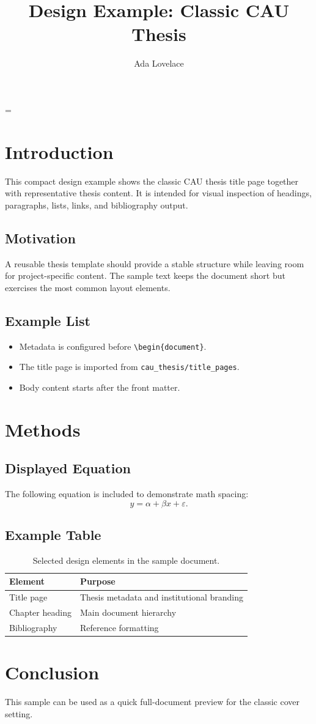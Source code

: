 \documentclass[12pt,a4paper]{../../../cau_thesis/cau_thesis}
\title{Design Example: Classic CAU Thesis}
\author{Ada Lovelace}
\institute{Institute of Computer Science}
\begin{document}
\sloppy
\hfuzz=\maxdimen
{}

\hypersetup{pageanchor=true}
\tableofcontents
\clearpage
{}

\chapter{Introduction}
This compact design example shows the classic CAU thesis title page together
with representative thesis content. It is intended for visual inspection of
headings, paragraphs, lists, links, and bibliography output.

\section{Motivation}
A reusable thesis template should provide a stable structure while leaving room
for project-specific content. The sample text keeps the document short but
exercises the most common layout elements.

\section{Example List}
\begin{itemize}
  \item Metadata is configured before \verb|\begin{document}|.
  \item The title page is imported from \verb|cau_thesis/title_pages|.
  \item Body content starts after the front matter.
\end{itemize}

\chapter{Methods}
\section{Displayed Equation}
The following equation is included to demonstrate math spacing:
\begin{equation}
  y = \alpha + \beta x + \varepsilon.
\end{equation}

\section{Example Table}
\begin{table}[h]
  \centering
  \begin{tabular}{ll}
    \toprule
    Element & Purpose \\
    \midrule
    Title page & Thesis metadata and institutional branding \\
    Chapter heading & Main document hierarchy \\
    Bibliography & Reference formatting \\
    \bottomrule
  \end{tabular}
  \caption{Selected design elements in the sample document.}
\end{table}

\chapter{Conclusion}
This sample can be used as a quick full-document preview for the classic cover
setting.
\end{document}
